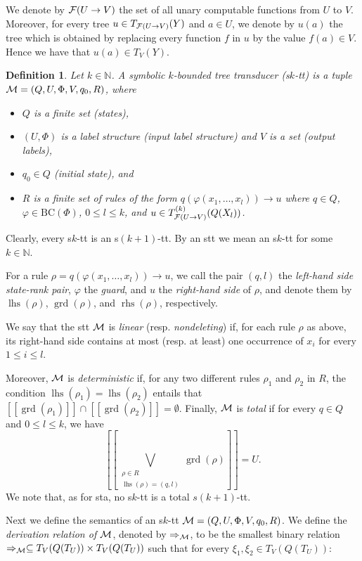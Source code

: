\documentclass[10pt]{scrartcl}
\newtheorem{df}{Definition}[section]
\newcommand{\nat}{\mathbb{N}}
\newcommand{\seml}{[\![}
\newcommand{\semr}{]\!]}
\newcommand{\BC}{\mathrm{BC}}
\newcommand{\M}{{\cal M}}
\newcommand{\F}{{\cal F}}
\DeclareMathOperator{\grd}{grd}
\DeclareMathOperator{\lhs}{lhs}
\DeclareMathOperator{\rhs}{rhs}
\def\ui#1{^{(#1)}}
\begin{document}
We denote by $\F(U \rightarrow V)$ the set of all unary computable functions from $U$ to $V$. Moreover, for every tree
$u \in T_{\F(U \rightarrow V)}(Y)$ and $a\in U$, we denote by $u(a)$ the tree which is obtained by replacing every function $f$ in $u$ by the value $f(a)\in V$. Hence we have that $u(a)\in T_{V}(Y)$.


\begin{df}\rm  Let $k \in \nat$. A \emph{symbolic $k$-bounded  tree transducer} (s$k$-tt) is a tuple
  $\M = (Q,U,\Phi,V,q_0,R)$, where
\begin{itemize}
\item $Q$ is a finite set (states),
\item $(U,\Phi)$ is a label structure (input label structure) and $V$ is a set (output labels),
\item $q_0 \in Q$ (initial state), and 
\item $R$ is a finite set of rules of the form $q(\varphi(x_1,\ldots,x_l)) \to u$ 
where $q \in Q$, $\varphi \in \BC(\Phi)$, $0 \le  l\le k$, and $u \in T_{\F(U \rightarrow V)}\ui k(Q(X_l))$. 
\end{itemize}
\end{df}
Clearly, every s$k$-tt is an s$(k+1)$-tt. By an stt we mean an s$k$-tt for some $k \in \nat$.  

For a rule $\rho = q(\varphi(x_1,\ldots,x_l)) \to u$, we call the pair $(q,l)$ the \emph{left-hand side state-rank pair}, $\varphi$ the \emph{guard}, and $u$ the
\emph{right-hand side} of $\rho$, and denote them  by $\lhs(\rho)$,  $\grd(\rho)$, and $\rhs(\rho)$, respectively. 

We say that the stt $\M$ is \emph{linear} (resp. \emph{nondeleting}) if, for each rule $\rho$ as above, its right-hand side contains at most (resp. at
least) one occurrence of $x_i$ for every $1 \le i \le l$.

Moreover,  $\M$ is \emph{deterministic} if, for any two different rules $\rho_1$ and $\rho_2$ in $R$, the condition $\lhs(\rho_1)=\lhs(\rho_2)$ entails that $\seml \grd(\rho_1) \semr\cap \seml \grd(\rho_2) \semr=\emptyset$. Finally, $\M$ is {\em total} if for every $q\in Q$ and $0\le l \le k$, we have
\[\seml \bigvee_{\substack{\rho\in R \\ \lhs(\rho)=(q,l)}}
\grd(\rho)\semr =U .\]
We note that, as for sta, no s$k$-tt is a total $s(k+1)$-tt.

Next we define the semantics of an s$k$-tt $\M = (Q,U,\Phi,V,q_0,R)$. 
We define the \emph{derivation relation of $\M$}, denoted by $\Rightarrow_{\M}$, to be the smallest binary relation $\Rightarrow_{\M} \subseteq T_V(Q(T_U)) \times T_V(Q(T_U))$ such that for every $\xi_1,\xi_2 \in T_V(Q(T_U))$:
\end{document}
